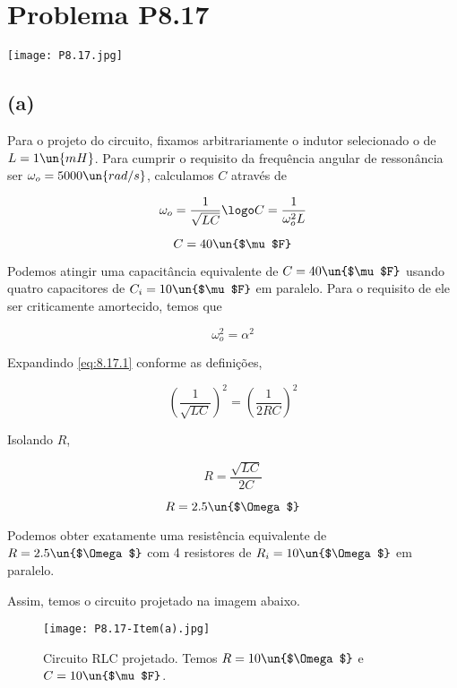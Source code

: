 
\section*{Problema P8.17}

\renewcommand*\thesection{8.17}

\begin{center}
    \texttt{[image: P8.17.jpg]}
\end{center}

\subsection*{(a)}

Para o projeto do circuito, fixamos arbitrariamente o indutor selecionado o de $L = 1 \un{mH}$. Para cumprir o
requisito da frequência angular de ressonância ser $\omega_o = 5000\un{rad/s}$, calculamos $C$ através de 

\[ \omega_o = \frac{1}{\sqrt{LC}} \logo C = \frac{1}{\omega_o^2L} \]

\[ C = 40 \un{$\mu$F} \]

Podemos atingir uma capacitância equivalente de $C = 40 \un{$\mu$F}$ usando quatro capacitores de $C_i = 10 \un{$\mu$F}$ em 
paralelo. Para o requisito de ele ser criticamente amortecido, temos que  

\begin{equation}\label{eq:8.17.1}
    \omega_o^2 = \alpha^2
\end{equation}

Expandindo \eqref{eq:8.17.1} conforme as definições,  

\[ \left(\frac{1}{\sqrt{LC}}\right)^2 = \left(\frac{1}{2RC}\right)^2  \]

Isolando $R$,

\[ R = \frac{\sqrt{LC}}{2C}  \]

\[ R = 2.5 \un{$\Omega$}  \]

Podemos obter exatamente uma resistência equivalente de $R = 2.5 \un{$\Omega$}$ com 4 resistores de $R_i = 10 \un{$\Omega$}$
em paralelo.

Assim, temos o circuito projetado na imagem abaixo.

\begin{figure}[hb]
    \centering
    \caption{Circuito RLC projetado. Temos $R = 10 \un{$\Omega$}$ e $C = 10 \un{$\mu$F}$.}
      \centering
      \texttt{[image: P8.17-Item(a).jpg]} \\
    \label{fig:8.17.1}
\end{figure}

